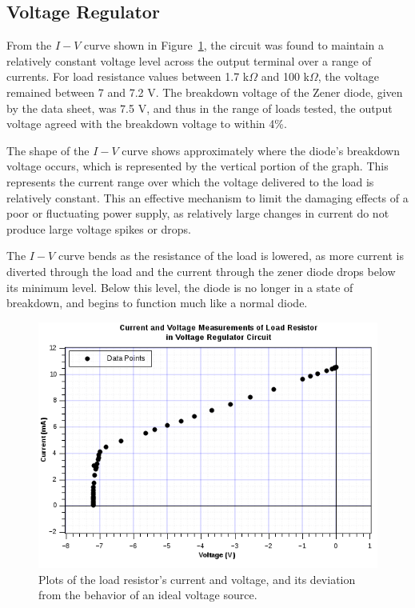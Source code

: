 \documentclass[twocolumn,english]{IEEEtran}
\begin{document}
\noindent\hrulefill
\subsection{\textbf{Voltage Regulator}}
From the $I-V$ curve shown in Figure~\ref{fig:voltage_reg}, the circuit was found to maintain a relatively constant voltage level across the output terminal over a range of currents. For load resistance values between 1.7 k$\Omega$ and 100 k$\Omega$, the voltage remained between 7 and 7.2 V. The breakdown voltage of the Zener diode, given by the data sheet, was 7.5 V, and thus in the range of loads tested, the output voltage agreed with the breakdown voltage to within 4\%.

The shape of the $I-V$ curve shows approximately where the diode's breakdown voltage occurs, which is represented by the vertical portion of the graph. This represents the current range over which the voltage delivered to the load is relatively constant. This an effective mechanism to limit the damaging effects of a poor or fluctuating power supply, as relatively large changes in current do not produce large voltage spikes or drops.

The $I-V$ curve bends as the resistance of the load is lowered, as more current is diverted through the load and the current through the zener diode drops below its minimum level. Below this level, the diode is no longer in a state of breakdown, and begins to function much like a normal diode.

\begin{figure}[H]
  \begin{centering}
  \begin{center}
  \includegraphics[width=\linewidth]{./voltage_reg.png}
  \caption{Plots of the load resistor's current and voltage, and its deviation from the behavior of an ideal voltage source.}
  \label{fig:voltage_reg}
  \end{center}
  \par\end{centering}
\end{figure}
\end{document}
